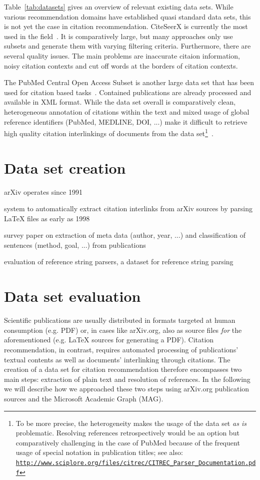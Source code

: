 Table~\ref{tab:datasets} gives an overview of relevant existing data sets. While various recommendation domains have established quasi standard data sets, this is not yet the case in citation recommendation. CiteSeerX is currently the most used in the field~\cite{Beel2016}. It is comparatively large, but many approaches only use subsets and generate them with varying filtering criteria. Furthermore, there are several quality issues. The main problems are inaccurate citaion information, noisy citation contexts and cut off words at the borders of citation contexts.

The PubMed Central Open Access Subset is another large data set that has been used for citation based tasks~\cite{Duma2016,Gipp2015,Galke2018,Bhagavatula2018}. Contained publications are already processed and available in XML format. While the data set overall is comparatively clean, heterogeneous annotation of citations within the text and mixed usage of global reference identifiers (PubMed, MEDLINE, DOI, ...) make it difficult to retrieve high quality citation interlinkings of documents from the data set\footnote{To be more precise, the heterogeneity makes the usage of the data set \emph{as is} problematic. Resolving references retrospectively would be an option but comparatively challenging in the case of PubMed because of the frequent usage of special notation in publication titles; see also: \texttt{\url{http://www.sciplore.org/files/citrec/CITREC_Parser_Documentation.pdf}}}~\cite{Gipp2015}.


\section{Data set creation}
arXiv operates since 1991\cite{Ginsparg1994}

system to automatically extract citation interlinks from arXiv sources by parsing LaTeX files as early as 1998\cite{Nanba1998}

survey paper on extraction of meta data (author, year, ...) and classification of sentences (method, goal, ...) from publications\cite{Nasar2018}

evaluation of reference string parsers\cite{Tkaczyk2018}, a dataset for reference string parsing\cite{Anzaroot2013}

\section{Data set evaluation}
Scientific publications are usually distributed in formats targeted at human consumption (e.g. PDF) or, in cases like arXiv.org, also as source files \emph{for} the aforementioned (e.g. LaTeX sources for generating a PDF). Citation recommendation, in contrast, requires automated processing of publications' textual contents as well as documents' interlinking through citations. The creation of a data set for citation recommendation therefore encompasses two main steps: extraction of plain text and resolution of references. In the following we will describe how we approached these two steps using arXiv.org publication sources and the Microsoft Academic Graph (MAG)\cite{Sinha2015}.
